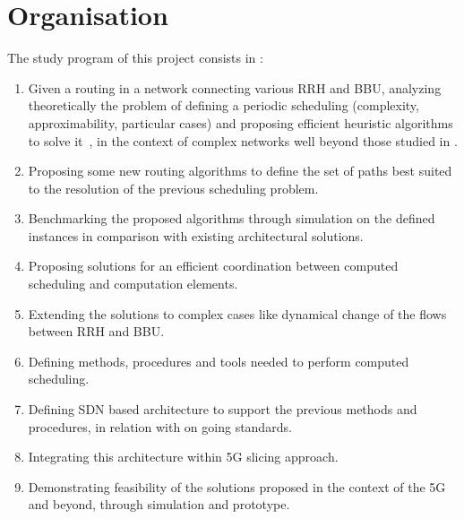 \documentclass{article}
\begin{document}
\section*{Organisation}
The study program of this project consists in :
 \begin{enumerate}
  \item Given a routing in a network connecting various RRH and BBU, analyzing theoretically the problem of defining a periodic scheduling (complexity, approximability, particular cases) and proposing efficient heuristic algorithms to solve it , in the context of complex networks well beyond those studied in \cite{rapportstage}.
\item  Proposing some new routing algorithms to define the set of paths  best suited to the resolution of  the previous scheduling problem.
\item  Benchmarking the proposed algorithms through simulation on the defined instances in comparison with existing architectural solutions.
\item  Proposing solutions for an efficient coordination between computed scheduling and computation elements.
\item  Extending the solutions to complex cases like dynamical change of the flows between RRH and BBU.
\item  Defining methods, procedures and tools needed to perform computed scheduling.
\item  Defining SDN based architecture to support the previous methods and procedures, in relation with on going standards.
\item  Integrating this architecture within 5G slicing approach.
\item  Demonstrating feasibility of the solutions proposed in the context of the 5G and beyond, through simulation and prototype. 
 \end{enumerate}


\end{document}
